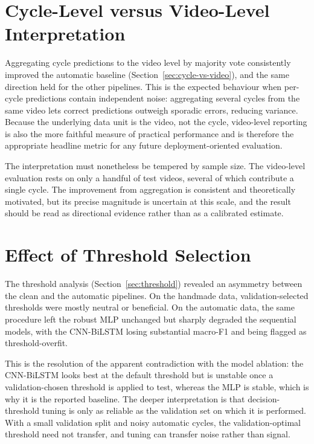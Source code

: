 \section{Cycle-Level versus Video-Level Interpretation}
\label{sec:disc-cycle-video}

Aggregating cycle predictions to the video level by majority vote consistently
improved the automatic baseline (Section~\ref{sec:cycle-vs-video}), and the same
direction held for the other pipelines. This is the expected behaviour when
per-cycle predictions contain independent noise: aggregating several cycles from
the same video lets correct predictions outweigh sporadic errors, reducing
variance. Because the underlying data unit is the video, not the cycle,
video-level reporting is also the more faithful measure of practical
performance and is therefore the appropriate headline metric for any future
deployment-oriented evaluation.

The interpretation must nonetheless be tempered by sample size. The video-level
evaluation rests on only a handful of test videos, several of which contribute a
single cycle. The improvement from aggregation is consistent and theoretically
motivated, but its precise magnitude is uncertain at this scale, and the result
should be read as directional evidence rather than as a calibrated estimate.

\section{Effect of Threshold Selection}
\label{sec:disc-threshold}

The threshold analysis (Section~\ref{sec:threshold}) revealed an asymmetry
between the clean and the automatic pipelines. On the handmade data,
validation-selected thresholds were mostly neutral or beneficial. On the
automatic data, the same procedure left the robust MLP unchanged but sharply
degraded the sequential models, with the CNN-BiLSTM losing substantial macro-F1
and being flagged as threshold-overfit.

This is the resolution of the apparent
contradiction with the model ablation: the CNN-BiLSTM looks best at the default
threshold but is unstable once a validation-chosen threshold is applied to
test, whereas the MLP is stable, which is why it is the reported baseline.
The deeper interpretation is that decision-threshold tuning is only as reliable
as the validation set on which it is performed. With a small validation split
and noisy automatic cycles, the validation-optimal threshold need not transfer,
and tuning can transfer noise rather than signal. 

